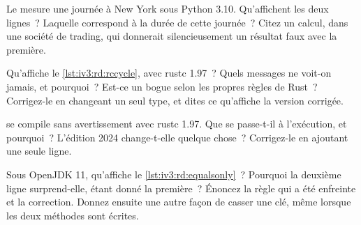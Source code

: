 \begin{question}\label{iq:iv3:reading-debugging-and-software-design:20}
Le  mesure une journée à New York sous Python 3.10. Qu'affichent les deux lignes~? Laquelle correspond à la durée de cette journée~? Citez un calcul, dans une société de trading, qui donnerait silencieusement un résultat faux avec la première.
\label{lst:iv3:rd:dst}
\end{question}

\begin{question}\label{iq:iv3:reading-debugging-and-software-design:21}
Qu'affiche le \cref{lst:iv3:rd:rccycle}, avec rustc 1.97~? Quels messages ne voit-on jamais, et pourquoi~? Est-ce un bogue selon les propres règles de Rust~? Corrigez-le en changeant un seul type, et dites ce qu'affiche la version corrigée.
\label{lst:iv3:rd:rccycle}
\end{question}

\begin{question}\label{iq:iv3:reading-debugging-and-software-design:22}
 se compile sans avertissement avec rustc 1.97. Que se passe-t-il à l'exécution, et pourquoi~? L'édition 2024 change-t-elle quelque chose~? Corrigez-le en ajoutant une seule ligne.
\label{lst:iv3:rd:guardmatch}
\end{question}

\begin{question}\label{iq:iv3:reading-debugging-and-software-design:23}
Sous OpenJDK 11, qu'affiche le \cref{lst:iv3:rd:equalsonly}~? Pourquoi la deuxième ligne surprend-elle, étant donné la première~? Énoncez la règle qui a été enfreinte et la correction. Donnez ensuite une autre façon de casser une clé, même lorsque les deux méthodes sont écrites.
\label{lst:iv3:rd:equalsonly}
\end{question}

